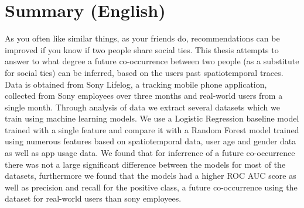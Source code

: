 \chapter{Summary (English)}
As you often like similar things, as your friends do, recommendations can be improved if you know if two people share social ties.
This thesis attempts to answer to what degree a future co-occurrence between two people (as a substitute for social ties) can be inferred, based on the users past spatiotemporal traces. 
Data is obtained from Sony Lifelog, a tracking mobile phone application, collected from Sony employees over three months and real-world users from a single month.
Through analysis of data we extract several datasets which we train using machine learning models.
We use a Logistic Regression baseline model trained with a single feature and compare it with a Random Forest model trained using numerous features based on spatiotemporal data, user age and gender data as well as app usage data. We found that for inferrence of a future co-occurrence there was not a large significant difference between the models for most of the datasets, furthermore we found that the models had a higher ROC AUC score as well as precision and recall for the positive class, a future co-occurrence using the dataset for real-world users than sony employees.
